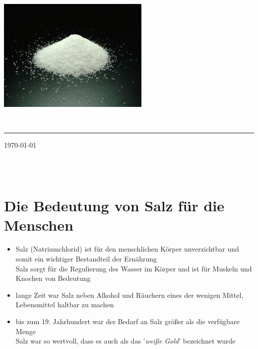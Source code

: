 \documentclass[11pt,a4paper]{article}
\begin{document}
\sffamily   %
\hfill%
\begin{minipage}[t]{.6\textwidth}
\raggedleft%
\includegraphics[width=0.55\textwidth]{Speisesalz.jpg}


\end{minipage}\\[0.5em]
%
{\color{firstnamecolor}\rule{\textwidth}{.25ex}}
%
\begin{minipage}[t]{.4\textwidth}
	\raggedright%
	\vspace*{1em}
	\small%
\end{minipage}
%
\hfill
%
\begin{minipage}[t]{.4\textwidth}
	\raggedleft %
	\today
\end{minipage}\\[2.2em]


{\bfseries {}}\\[0.75em]

\section*{\textsf{Die Bedeutung von Salz für die Menschen}}

\begin{itemize}
\item Salz (Natriumchlorid) ist für den menschlichen Körper unverzichtbar und somit ein wichtiger Bestandteil der Ernährung\\
 Salz sorgt für die Regulierung des Wasser im Körper und ist für Muskeln und Knochen von Bedeutung

\item lange Zeit war Salz neben Alkohol und Räuchern eines der wenigen Mittel, Lebensmittel haltbar zu machen

\item bis zum 19. Jahrhundert war der Bedarf an Salz größer als die verfügbare Menge\\
 Salz war so wertvoll, dass es auch als das '\textsl{weiße Gold}' bezeichnet wurde


\end{itemize}
\end{document}
